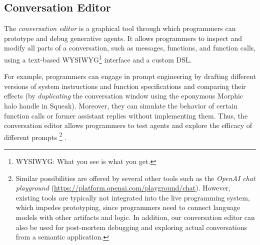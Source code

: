 \subsection*{Conversation Editor}
\label{sec:semtex/tools/editor}

The \emph{conversation editor} is a graphical tool through which programmers can prototype and debug generative agents.
It allows programmers to inspect and modify all parts of a conversation, such as messages, functions, and function calls, using a text-based WYSIWYG\footnote{WYSIWYG: What you see is what you get.} interface and a custom DSL.

\FloatBarrier

For example, programmers can engage in prompt engineering by drafting different versions of system instructions and function specifications and comparing their effects (by \emph{duplicating} the conversation window using the eponymous Morphic halo handle in Squeak).
Moreover, they can simulate the behavior of certain function calls or former assistant replies without implementing them.
Thus, the conversation editor allows programmers to test agents and explore the efficacy of different prompts%
\footnote{%
	Similar possibilities are offered by several other tools such as the \emph{OpenAI chat playground} (\url{https://platform.openai.com/playground/chat}).
	However, existing tools are typically not integrated into the live programming system, which impedes prototyping, since programmers need to connect language models with other artifacts and logic.
	In addition, our conversation editor can also be used for post-mortem debugging and exploring actual conversations from a semantic application.
}%
.

